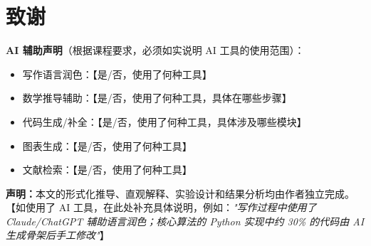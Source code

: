 \section*{致谢}


\noindent\textbf{AI 辅助声明}（根据课程要求，必须如实说明 AI 工具的使用范围）：

\begin{itemize}
    \item 写作语言润色：【是/否，使用了何种工具】
    \item 数学推导辅助：【是/否，使用了何种工具，具体在哪些步骤】
    \item 代码生成/补全：【是/否，使用了何种工具，具体涉及哪些模块】
    \item 图表生成：【是/否，使用了何种工具】
    \item 文献检索：【是/否，使用了何种工具】
\end{itemize}

\textbf{声明：}本文的形式化推导、直观解释、实验设计和结果分析均由作者独立完成。
【如使用了 AI 工具，在此处补充具体说明，例如：\textit{"写作过程中使用了 Claude/ChatGPT 辅助语言润色；核心算法的 Python 实现中约 30\% 的代码由 AI 生成骨架后手工修改"}】

\vspace{1em}

